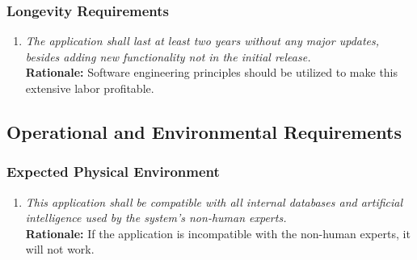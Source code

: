 \documentclass[]{article}
\begin{document}
\subsubsection{Longevity Requirements}
\label{ssub:longevity_requirements}
\begin{enumerate}[{PR-L}1. ]
	\item \textit{The application shall last at least two years without any major updates, besides adding new functionality not in the initial release.} \\ \textbf{Rationale:} Software engineering principles should be utilized to make this extensive labor profitable.
\end{enumerate}


\subsection{Operational and Environmental Requirements}
\label{sub:operational_and_environmental_requirements}

\subsubsection{Expected Physical Environment}
\label{ssub:expected_physical_environment}
\begin{enumerate}[{OE-EPE}1. ]
	\item \textit{This application shall be compatible with all internal databases and artificial intelligence used by the system's non-human experts.} \\ \textbf{Rationale:} If the application is incompatible with the non-human experts, it will not work.
\end{enumerate}
\end{document}
